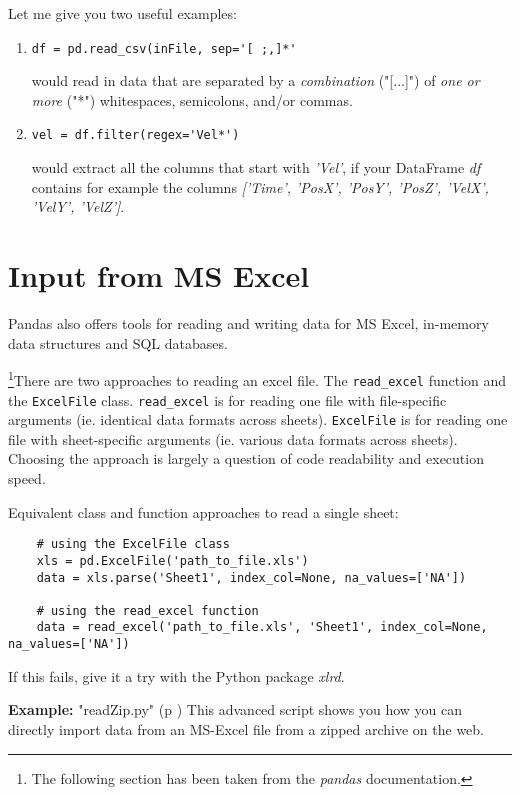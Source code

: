 Let me give you two useful examples:

\begin{enumerate}
  \item \lstinline{df = pd.read_csv(inFile, sep='[ ;,]*'}

  would read in data that are separated by a \emph{combination} ("[...]") of \emph{one or more} ("*") whitespaces, semicolons, and/or commas.

  \item \lstinline{vel = df.filter(regex='Vel*')}

  would extract all the columns that start with \emph{'Vel'}, if your DataFrame \emph{df} contains for example the columns \emph{['Time', 'PosX', 'PosY', 'PosZ', 'VelX', 'VelY', 'VelZ']}.
\end{enumerate}

\section{Input from MS Excel}

Pandas also offers tools for reading and writing data for MS Excel, in-memory data structures and SQL databases.

\footnote{The following section has been taken from the \emph{pandas} documentation.}There are two approaches to reading an excel file. The \lstinline{read_excel} function and the \lstinline{ExcelFile} class. \lstinline{read_excel} is for reading one file with file-specific arguments (ie. identical data formats across sheets). \lstinline{ExcelFile} is for reading one file with sheet-specific arguments (ie. various data formats across sheets). Choosing the approach is largely a question of code readability and execution speed.

Equivalent class and function approaches to read a single sheet:

\begin{lstlisting}
    # using the ExcelFile class
    xls = pd.ExcelFile('path_to_file.xls')
    data = xls.parse('Sheet1', index_col=None, na_values=['NA'])

    # using the read_excel function
    data = read_excel('path_to_file.xls', 'Sheet1', index_col=None, na_values=['NA'])
\end{lstlisting}

If this fails, give it a try with the Python package \emph{xlrd}.

\textbf{Example: }
\PyImg "readZip.py" (p \pageref{py:readZip}) This advanced script shows you how you can directly import data from an MS-Excel file from a zipped archive on the web.

